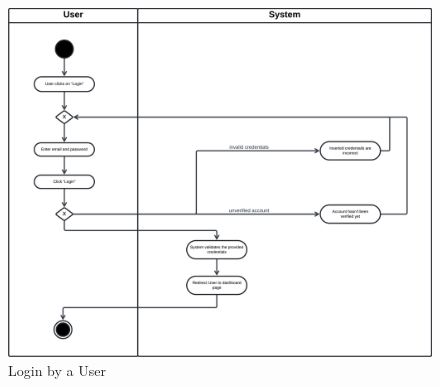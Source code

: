 \begin{figure}[H]
    \begin{center}
         \includegraphics[width=1\linewidth]{LaTeXCode/images/activity diagram/UC4.png}
         \caption{Login by a User}
         \label{fig:login_user_ad}
     \end{center}
\end{figure}

\newpage

